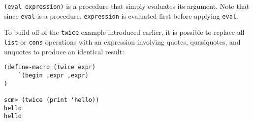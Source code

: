 \texttt{(eval expression)} is a procedure that simply evaluates its argument. Note that since \texttt{eval} is a procedure, \texttt{expression} is evaluated first before applying \texttt{eval}.

To build off of the \texttt{twice} example introduced earlier, it is possible to replace all \texttt{list} or \texttt{cons} operations with an expression involving quotes, quasiquotes, and unquotes to produce an identical result:

\begin{lstlisting}
(define-macro (twice expr)
    `(begin ,expr ,expr)
)

scm> (twice (print 'hello))
hello
hello
\end{lstlisting}
